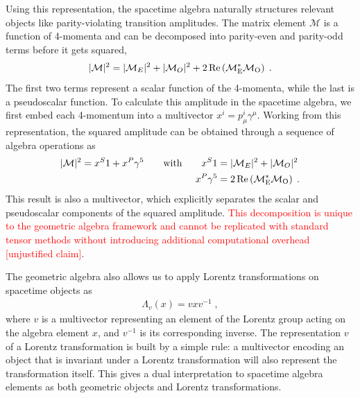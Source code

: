 \documentclass[submission, Phys]{SciPost}
\begin{document}
Using this representation, the spacetime algebra naturally structures relevant objects like parity-violating transition amplitudes. The matrix element $\mathcal{M}$ is a function of 4-momenta and can be decomposed into parity-even and parity-odd terms before it gets squared,
%
\begin{align}
    |\mathcal{M}|^2 = |\mathcal{M}_E|^2 + |\mathcal{M}_O|^2 + 2\, \rm{Re}\left(\mathcal{M}_E^* \mathcal{M}_O \right) \; .
\end{align}
%
The first two terms represent a scalar function of the 4-momenta, while the last is a pseudoscalar function. To calculate this amplitude in the spacetime algebra, we first embed each 4-momentum into a multivector $x^i = p_\mu^i \gamma^\mu$. Working from this representation, the squared amplitude can be obtained through a sequence of algebra operations as
%
\begin{align}
    |\mathcal{M}|^2 = x^S1 + x^P \gamma^5 
    \qquad \text{with} \qquad 
    x^S1 &= |\mathcal{M}_E|^2 + |\mathcal{M}_O|^2 \notag \\
    x^P \gamma^5 &= 2\, \rm{Re}\left(\mathcal{M}_E^* \mathcal{M}_O \right) \; . 
\end{align}
%
This result is also a multivector, which explicitly separates the scalar and pseudoscalar components of the squared amplitude. \textcolor{red}{This decomposition is unique to the geometric algebra framework and cannot be replicated with standard tensor methods without introducing additional computational overhead [unjustified claim]}.

The geometric algebra also allows us to apply Lorentz transformations on spacetime objects as 
%
\begin{align}
    \Lambda_v(x) = vxv^{-1} \; , 
    \label{eq:lorentz_law}
\end{align}
%
where $v$ is a multivector representing an element of the Lorentz group acting on the algebra element $x$, and $v^{-1}$ is its corresponding inverse. The representation $v$ of a Lorentz transformation is built by a simple rule: a multivector encoding an object that is invariant under a Lorentz transformation will also represent the transformation itself. This gives a dual interpretation to spacetime algebra elements as both geometric objects and Lorentz transformations.
\end{document}
